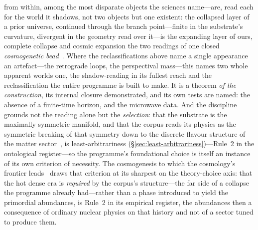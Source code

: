 \documentclass[11pt,a4paper]{article}
\begin{document}
from within, among the most disparate objects the sciences name---are, read each for the world it shadows, not two objects but one existent: the collapsed layer of a prior universe, continued through the branch point---finite in the substrate's curvature, divergent in the geometry read over it---is the expanding layer of ours, complete collapse and cosmic expansion the two readings of one closed \emph{cosmogenetic bead}~\cite{JanzenCRframework}. Where the reclassifications above name a single appearance an artefact---the retrograde loops, the perspectival mass---this names two whole apparent worlds one, the shadow-reading in its fullest reach and the reclassification the entire programme is built to make. It is a theorem \emph{of the construction}, its internal closure demonstrated, and its own tests are named: the absence of a finite-time horizon, and the microwave data. And the discipline grounds not the reading alone but the \emph{selection}: that the substrate is the maximally symmetric manifold, and that the corpus reads its physics as the symmetric breaking of that symmetry down to the discrete flavour structure of the matter sector~\cite{JanzenMatter}, is least-arbitrariness (\S\ref{sec:least-arbitrariness})---Rule~2 in the ontological register---so the programme's foundational choice is itself an instance of its own criterion of necessity. The cosmogenesis to which the cosmology's frontier leads~\cite{JanzenCosmogenesis} draws that criterion at its sharpest on the theory-choice axis: that the hot dense era is \emph{required} by the corpus's structure---the far side of a collapse the programme already had---rather than a phase introduced to yield the primordial abundances, is Rule~2 in its empirical register, the abundances then a consequence of ordinary nuclear physics on that history and not of a sector tuned to produce them.
\end{document}
